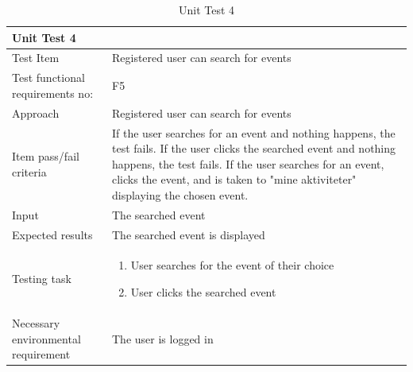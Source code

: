 \begin{table}[H]
\begin{tabular}{ | L{0.25\linewidth} | L{0.75\linewidth} | } 
 \hline {}
 Unit Test 4 & \\
 \hline
 Test Item & Registered user can search for events\\ 
 \hline
 Test functional requirements no: & F5
 \\
 \hline
 Approach & Registered user can search for events\\ 
  \hline
 Item pass/fail criteria & If the user searches for an event and nothing happens, the test fails. If the user clicks the searched event and nothing happens, the test fails. If the user searches for an event, clicks the event, and is taken to "mine aktiviteter" displaying the chosen event.\\ 
 \hline
 Input &  The searched event\\ 
 \hline
 Expected results & The searched event is displayed \\ 
  \hline
Testing task & 
\vspace{-5mm}
    \begin{enumerate}[noitemsep]
  \item User searches for the event of their choice
  \item User clicks the searched event
   \end{enumerate}\\
 \hline
 Necessary environmental requirement & The user is logged in\\ 
 \hline
\end{tabular}
\caption{Unit Test 4}
\end{table}

